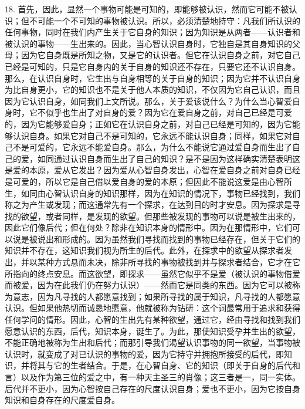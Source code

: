 18. 首先，因此，显然一个事物可能是可知的，即能够被认识，然而它可能不被认识；但不可能一个不可知的事物被认识。所以，必须清楚地持守：凡我们所认识的任何事物，同时在我们内产生关于它自身的知识；因为知识是从两者——认识者和被认识的事物——生出来的。因此，当心智认识自身时，它独自是其自身知识的父母；因为它自身既是所知之物，又是它的认识者。但它在认识自身之前，对它自己已经是可知的，只是它自身内的关于自身的知识还不存在，只要它还不认识自身。那么，在认识自身时，它生出与自身相等的关于自身的知识；因为它并不认识自身为比自身更小，它的知识也不是关于他人本质的知识，不仅因为它自己认识，而且因为它认识自身，如同我们上文所说。那么，关于爱该说什么？为什么当心智爱自身时，它不似乎也生出了对自身的爱？因为它在爱自身之前，对自己已经是可爱的，因为它能够爱自身；正如它在认识自身之前，对自己已经是可知的，因为它能够认识自身。如果它对自己不是可知的，它永远不能认识自身；同样，如果它对自己不是可爱的，它永远不能爱自身。那么，为什么不能说它通过爱自身而生出了自己的爱，如同通过认识自身而生出了自己的知识？是不是因为这样确实清楚表明这是爱的本原，爱从它发出？因为爱从心智自身发出，心智在爱自身之前对自身已经是可爱的，所以它是自己借以爱自身的爱的本原；但因此不能说这爱是由心智所生，如同由心智认识自身的知识那样，因为在知识的情况下，事物已经找到，我们称之为产生或发现；而这通常先有一个探求，在达到目的时才安息。因为探求是寻找的欲望，或者同样，是发现的欲望。但那些被发现的事物可以说是被生出来的，因此它们像后代；但在何处？除非在知识本身的情形中。因为在那情形中，它们可以说是被说出和形成的。因为虽然我们寻找而找到的事物已经存在，但关于它们的知识并不存在，这知识我们视为所生的后代。此外，在探求中的欲望从探求者发出，并以某种方式悬而未决，除非所寻找的事物被找到并与探求者结合，它才在它所指向的终点安息。而这欲望，即探求——虽然它似乎不是爱（被认识的事物借爱而被爱，因为在此我们仍在努力认识）——然而它是同类的东西。因为它可以被称为意志，因为凡寻找的人都愿意找到；如果所寻找的属于知识，凡寻找的人都愿意认识。但如果他热切而诚恳地愿意，他就被称为钻研：这个词最常用于追求和获得任何学问的情形。因此，心智的生出先有某种欲望，通过它，经由寻找和找到我们愿意认识的东西，后代，知识本身，诞生了。为此，那使知识受孕并生出的欲望，不能正确地被称为生出和后代；而那引导我们渴望认识事物的同一欲望，当事物被认识时，就变成了对已认识的事物的爱，因为它持守并拥抱所接受的后代，即知识，并将其与它的生者结合。于是，在心智自身、它的知识（即关于自身的后代和言）以及作为第三位的爱之中，有一种天主圣三的肖像；这三者是一，同一实体。后代并不更小，因为心智按自己存在的尺度认识自身；爱也不更小，因为它按自身知识和自身存在的尺度爱自身。\par

